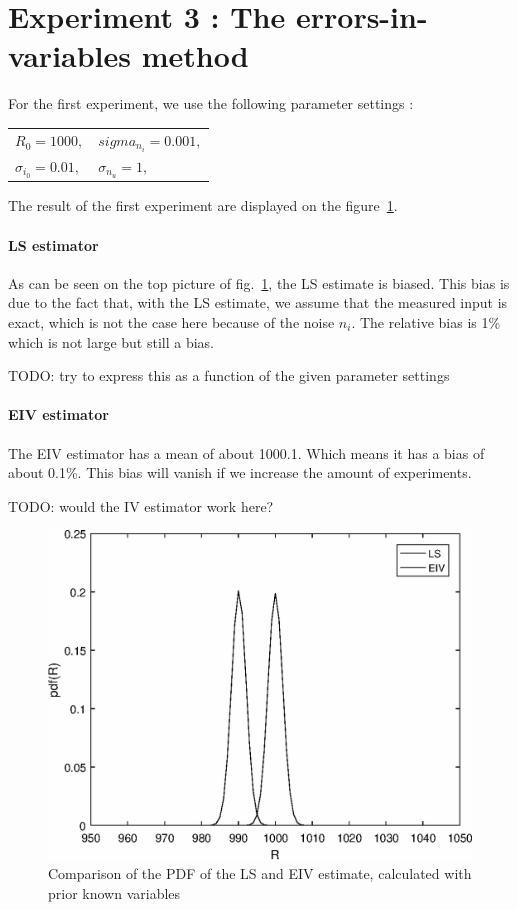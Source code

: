 \section{Experiment 3 : The errors-in-variables method}
For the first experiment, we use the following parameter settings : 

\begin{table}[h]
\centering
\begin{tabular}{ll}
    $ R_0 = 1000, $  &  $ sigma_{n_i} = 0.001, $   \\
    $ \sigma_{i_0} = 0.01, $  &  $ \sigma_{n_u} = 1, $   \\
\end{tabular}
\end{table}
The result of the first experiment are displayed on the figure~\ref{Sess1_part1_exp1}.

\paragraph{LS estimator} As can be seen on the top picture of fig.~\ref{Sess1_part1_exp1}, the LS estimate is biased. This bias is due to the fact that, with the LS estimate, we assume that the measured input is exact, which is not the case here because of the noise $n_i$. The relative bias is 1\% which is not large but still a bias.

TODO: try to express this as a function of the given parameter settings

\paragraph{EIV estimator} The EIV estimator has a mean of about 1000.1. Which means it has a bias of about 0.1\%. This bias will vanish if we increase the amount of experiments.

TODO: would the IV estimator work here?

\begin{figure}[H]
    \centering
    \includegraphics[width=1\textwidth]{Figures/Sess1_part2.eps}
    \caption{Comparison of the PDF of the LS and EIV estimate, calculated with prior known variables}
    \label{Sess1_part1_exp1}
\end{figure}

